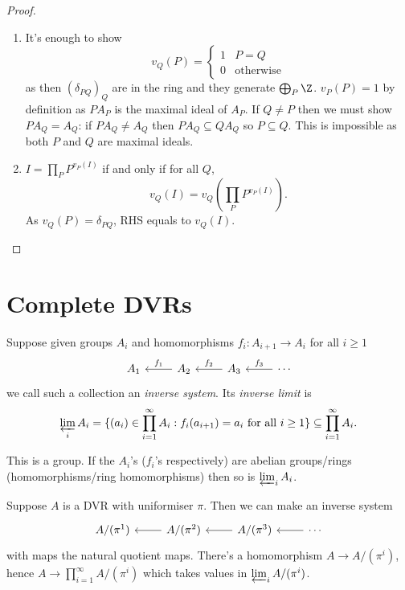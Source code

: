 \documentclass[a4paper]{article}
\begin{document}
\begin{proof}\leavevmode
  \begin{enumerate}
  \item It's enough to show
    \[
      v_Q(P) =
      \begin{cases}
        1 & P = Q \\
        0 & \text{otherwise}
      \end{cases}
    \]
    as then \((\delta_{PQ})_Q\) are in the ring and they generate \(\bigoplus_P \Z\). \(v_P(P) = 1\) by definition as \(P A_P\) is the maximal ideal of \(A_P\). If \(Q \neq P\) then we must show \(P A_Q = A_Q\): if \(P A_Q \neq A_Q\) then \(P A_Q \subseteq Q A_Q\) so \(P \subseteq Q\). This is impossible as both \(P\) and \(Q\) are maximal ideals.
  \item \(I = \prod_P P^{v_P(I)}\) if and only if for all \(Q\),
    \[
      v_Q(I) = v_Q(\prod_P P^{v_P(I)}).
    \]
    As \(v_Q(P) = \delta_{PQ}\), RHS equals to \(v_Q(I)\).
  \end{enumerate}
\end{proof}

\section{Complete DVRs}

\begin{definition}
  Suppose given groups \(A_i\) and homomorphisms \(f_i: A_{i + 1} \to A_i\) for all \(i \geq 1\)
  \[
    \begin{tikzcd}
      A_1 & A_2 \ar[l, "f_1"'] & A_3 \ar[l, "f_2"'] & \cdots \ar[l, "f_3"']
    \end{tikzcd}
  \]
  we call such a collection an \emph{inverse system}. Its \emph{inverse limit} is
  \[
    \varprojlim_i A_i = \{(a_i) \in \prod_{i = 1}^\infty A_i: f_i(a_{i + 1}) = a_i \text{ for all } i \geq 1\} \subseteq \prod_{i = 1}^\infty A_i.
  \]
\end{definition}

This is a group. If the \(A_i\)'s (\(f_i\)'s respectively) are abelian groups/rings (homomorphisms/ring homomorphisms) then so is \(\varprojlim_i A_i\).

Suppose \(A\) is a DVR with uniformiser \(\pi\). Then we can make an inverse system
\[
  \begin{tikzcd}
    A/(\pi^1) & A/(\pi^2) \ar[l] & A/(\pi^3) \ar[l] & \cdots \ar[l]
  \end{tikzcd}
\]
with maps the natural quotient maps. There's a homomorphism \(A \to A/(\pi^i)\), hence \(A \to \prod_{i = 1}^\infty A/(\pi^i)\) which takes values in \(\varprojlim_i A/(\pi^i)\).
\end{document}
